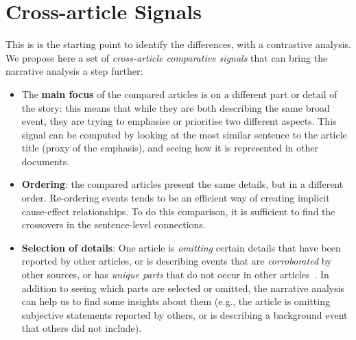 \section{Cross-article Signals}
This is is the starting point to identify the differences, with a contrastive analysis. We propose here a set of \emph{cross-article comparative signals} that can bring the narrative analysis a step further:
\begin{itemize}
    \item The \textbf{main focus} of the compared articles is on a different part or detail of the story: this means that while they are both describing the same broad event, they are trying to emphasise or prioritise two different aspects.
    This signal can be computed by looking at the most similar sentence to the article title (proxy of the emphasis), and seeing how it is represented in other documents.
    
    \item \textbf{Ordering}: the compared articles present the same details, but in a different order.
    Re-ordering events tends to be an efficient way of creating implicit cause-effect relationships. 
    To do this comparison, it is sufficient to find the crossovers in the sentence-level connections.

    \item \textbf{Selection of details}:
    One article is \emph{omitting} certain details that have been reported by other articles, or is describing events that are \emph{corroborated} by other sources, or has \emph{unique parts} that do not occur in other articles~\cite{bountouridis2018explaining}.
    In addition to seeing which parts are selected or omitted, the narrative analysis can help us to find some insights about them (e.g., the article is omitting subjective statements reported by others, or is describing a background event that others did not include).
    

\end{itemize}
